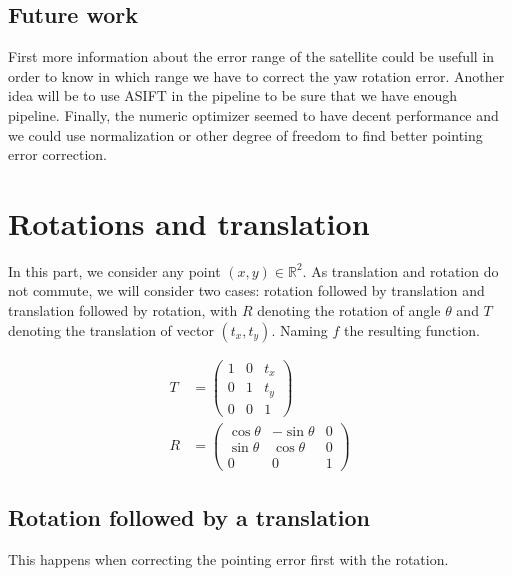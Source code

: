 \documentclass[paper=a4, fontsize=11pt, onecolumn, tikz, dvipsnames, svgnames, x11names]{article}
\begin{document}
\subsection{Future work}
First more information about the error range of the satellite could be usefull in order to know in which range we have to correct the yaw rotation error. Another idea will be to use ASIFT in the pipeline to be sure that we have enough pipeline. Finally, the numeric optimizer seemed to have decent performance and we could use normalization or other degree of freedom to find better pointing error correction.


\newpage

\appendix

\section{Rotations and translation}

In this part, we consider any point \((x, y) \in \mathbb{R}^2\). As translation and rotation do not commute, we will consider two cases: rotation followed by translation and translation followed by rotation, with \(R\) denoting the rotation of angle \(\theta\) and \(T\) denoting the translation of vector \((t_x, t_y)\). Naming \(f\) the resulting function.

\begin{align*}
    T &=
    \begin{pmatrix}
    1 & 0 & t_x \\
    0 & 1 & t_y \\
    0 & 0 & 1
    \end{pmatrix}
    \\
    R &=
    \begin{pmatrix}
    \cos \theta & -\sin \theta & 0 \\
    \sin \theta & \cos \theta & 0 \\
    0 & 0 & 1
    \end{pmatrix}
\end{align*}


\subsection{Rotation followed by a translation}
This happens when correcting the pointing error first with the rotation.
\end{document}
